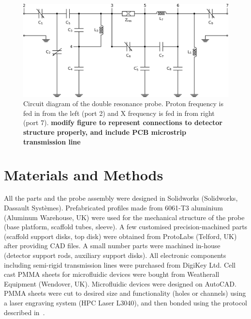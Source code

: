 \documentclass[preprint,12pt]{article}
\newcommand{\todo}[1]{{\color{red}\textbf{#1}}}
\begin{document}
\begin{figure}
\centering
\includegraphics[width=.7\linewidth,keepaspectratio=true]{./figures/ms5n17-tlp-im-180110-circuit-diagram.png}
\caption{Circuit diagram of the double resonance probe. 
Proton frequency is fed in from the left (port 2) and X frequency is fed in from right (port 7).
\todo{modify figure to represent connections to detector structure properly, and include PCB microstrip
transmission line}
}
\label{fig:circuit}
\end{figure}
\section{Materials and Methods}
All the parts and the probe assembly were designed in Solidworks (Solidworks, Dassault Syst\`{e}mes). 
Prefabricated profiles made from 6061-T3 aluminium (Aluminum Warehouse, UK) were used for the
 mechanical structure of the probe
(base platform, scaffold tubes, sleeve). 
A few customised precision-machined parts (scaffold support disks, top disk) were obtained from 
ProtoLabs (Telford, UK) after providing CAD files. A small number parts were machined in-house
 (detector support rods, auxiliary support disks). 
 All  electronic components including semi-rigid transmission lines were purchased from DigiKey Ltd. 
 Cell cast PMMA sheets for microfluidic devices were bought from Weatherall Equipment (Wendover, UK). Microfluidic 
devices were designed on AutoCAD. PMMA sheets were cut to desired size and functionality (holes or channels) using a 
laser engraving system  (HPC Laser L3040), 
and then bonded using the protocol described in~\cite{yilmaz_bonding}.
\end{document}
